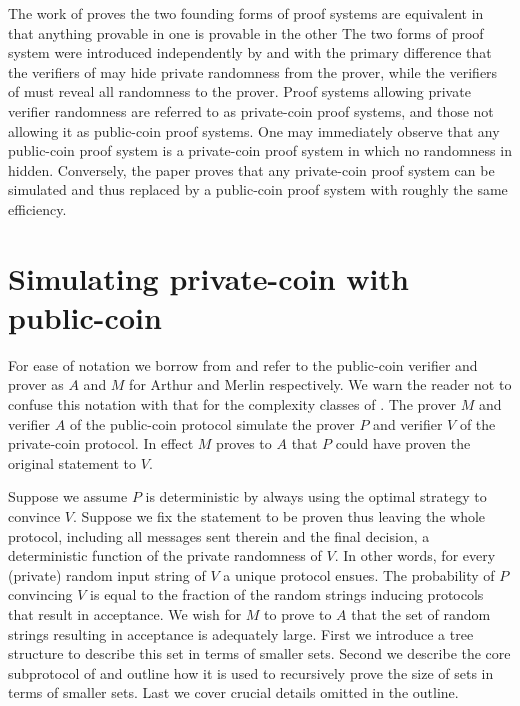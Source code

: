
The work of \cite{GS86} proves the two founding forms of proof systems are equivalent in that anything provable in one is provable in the other
The two forms of proof system were introduced independently by \cite{GMR85} and \cite{Bab85} with the primary difference that the verifiers of \cite{GMR85} may hide private randomness from the prover, while the verifiers of \cite{Bab85} must reveal all randomness to the prover.
Proof systems allowing private verifier randomness are referred to as private-coin proof systems, and those not allowing it as public-coin proof systems.
One may immediately observe that any public-coin proof system is a private-coin proof system in which no randomness in hidden.
Conversely, the paper proves that any private-coin proof system can be simulated and thus replaced by a public-coin proof system with roughly the same efficiency.








\section{Simulating private-coin with public-coin}

For ease of notation we borrow from \cite{Bab85} and refer to the public-coin verifier and prover as $A$ and $M$ for Arthur and Merlin respectively.
We warn the reader not to confuse this notation with that for the complexity classes of \cite{Bab85}.
The prover $M$ and verifier $A$ of the public-coin protocol simulate the prover $P$ and verifier $V$ of the private-coin protocol.
In effect $M$ proves to $A$ that $P$ could have proven the original statement to $V$.

Suppose we assume $P$ is deterministic by always using the optimal strategy to convince $V$.
Suppose we fix the statement to be proven thus leaving the whole protocol, including all messages sent therein and the final decision, a deterministic function of the private randomness of $V$.
In other words, for every (private) random input string of $V$ a unique protocol ensues.
The probability of $P$ convincing $V$ is equal to the fraction of the random strings inducing protocols that result in acceptance.
We wish for $M$ to prove to $A$ that the set of random strings resulting in acceptance is adequately large.
First we introduce a tree structure to describe this set in terms of smaller sets.
Second we describe the core subprotocol of \cite{GS86} and outline how it is used to recursively prove the size of sets in terms of smaller sets.
Last we cover crucial details omitted in the outline.

